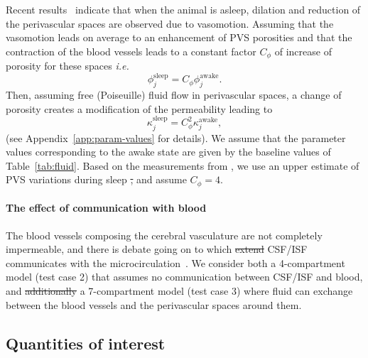 \documentclass[a4paper,11pt]{article} %
\newcommand{\ie}{\emph{i.e.}\;}
\newcommand{\eg}{\emph{e.g.}\;}
\newcommand{\1}{^{(1)}}
\newcommand{\2}{^{(2)}}
\newcommand{\Cinulin}{$\prescript{14}{}{\text{C}}$-inulin }
\newcommand{\commentout}[1]{}
\providecommand{\DIFaddtex}[1]{{\protect\color{blue}\uwave{#1}}} %
\providecommand{\DIFdeltex}[1]{{\protect\color{red}\sout{#1}}}                      %
\providecommand{\DIFaddbegin}{} %
\providecommand{\DIFaddend}{} %
\providecommand{\DIFdelbegin}{} %
\providecommand{\DIFdelend}{} %
\providecommand{\DIFadd}[1]{\texorpdfstring{\DIFaddtex{#1}}{#1}} %
\providecommand{\DIFdel}[1]{\texorpdfstring{\DIFdeltex{#1}}{}} %
\newcommand{\DIFscaledelfig}{0.5}
\newlength{\DIFdelgraphicswidth} %
\newlength{\DIFdelgraphicsheight} %
\newcommand{\DIFaddincludegraphics}[2][]{{\color{blue}\fbox{\DIFOincludegraphics[#1]{#2}}}} %
\newcommand{\DIFdelincludegraphics}[2][]{%
\sbox{\DIFdelgraphicsbox}{\DIFOincludegraphics[#1]{#2}}%
\settoboxwidth{\DIFdelgraphicswidth}{\DIFdelgraphicsbox} %
\settoboxtotalheight{\DIFdelgraphicsheight}{\DIFdelgraphicsbox} %
\scalebox{\DIFscaledelfig}{%
\parbox[b]{\DIFdelgraphicswidth}{\usebox{\DIFdelgraphicsbox}\\[-\baselineskip] \rule{\DIFdelgraphicswidth}{0em}}\llap{\resizebox{\DIFdelgraphicswidth}{\DIFdelgraphicsheight}{%
\setlength{\unitlength}{\DIFdelgraphicswidth}%
\begin{picture}(1,1)%
\thicklines\linethickness{2pt} %
{\color[rgb]{1,0,0}\put(0,0){\framebox(1,1){}}}%
{\color[rgb]{1,0,0}\put(0,0){\line( 1,1){1}}}%
{\color[rgb]{1,0,0}\put(0,1){\line(1,-1){1}}}%
\end{picture}%
}\hspace*{3pt}}} %
} %
\DeclareRobustCommand{\DIFaddbegin}{\DIFOaddbegin \let\includegraphics\DIFaddincludegraphics} %
\DeclareRobustCommand{\DIFaddend}{\DIFOaddend \let\includegraphics\DIFOincludegraphics} %
\DeclareRobustCommand{\DIFdelbegin}{\DIFOdelbegin \let\includegraphics\DIFdelincludegraphics} %
\DeclareRobustCommand{\DIFdelend}{\DIFOaddend \let\includegraphics\DIFOincludegraphics} %
\begin{document}
Recent results~\cite{Bojarskaite2022} indicate that when the animal is asleep, dilation and reduction of the perivascular spaces are observed due to vasomotion. Assuming that the vasomotion leads on average to an enhancement of PVS porosities and that the contraction of the blood vessels leads to a constant factor $C_\phi$ of increase of porosity for these spaces \ie 
\[
    \phi^\text{sleep}_j = C_\phi \phi_j^\text{awake}.
\]
Then, assuming free (Poiseuille) fluid flow in perivascular spaces, a change of porosity creates a modification of the permeability leading to 
\[
    \kappa_j^\text{sleep} = C_\phi^2 \kappa_j^\text{awake},
\]
(see Appendix~\ref{app:param-values} for details).
We assume that the parameter values corresponding to the awake state are given by the baseline values of Table~\ref{tab:fluid}. Based on the measurements from \cite{Bojarskaite2022}, we use an upper estimate of PVS variations during sleep \DIFdelbegin \DIFdel{, }\DIFdelend and assume $C_\phi=4$.


\paragraph{The effect of communication with blood}
The blood vessels composing the cerebral vasculature are not completely impermeable, and there is \DIFaddbegin \DIFadd{a }\DIFaddend debate going on to which \DIFdelbegin \DIFdel{extend }\DIFdelend \DIFaddbegin \DIFadd{extent }\DIFaddend CSF/ISF communicates with the microcirculation~\cite{Oreskovic-2010-formation}. We consider both a 4-compartment model (test case 2) that assumes no communication between CSF/ISF and blood, and \DIFdelbegin \DIFdel{additionally }\DIFdelend a 7-compartment model (test case 3) where fluid can exchange between the blood vessels and the perivascular spaces around them. 



\DIFdelbegin \DIFdel{\commentout{
\paragraph{The effect of blood vessels}
In the usual picture of the Glymphatic system, the leakage or resorption of fluid from the blood vessels is not considered. However, even though the BBB is known to be a tight selective barrier, a small amount of fluid can cross the membrane of blood vessels. The hydraulic conductivity of capillaries, arterioles and venules have been measured in different species and is known to not be zero (see \eg~\cite{fraser1990measurement, kimura1993measurement, roberts2009ppar}). We consider the effect of fluid leakage from the blood vessel in the third test case corresponding to an application of the model~\eqref{eq:main-system} with 7 compartments. The baseline parameter values for the fluid flow are given in Table~\ref{tab:fluid} and for the transfer between compartments in Table~\ref{tab:exchange}. We highlight here that no transfer of \Cinulin from PVS to the blood is considered since this molecule is known to not cross the BBB.
}
}\DIFdelend \subsection{Quantities of interest}
\end{document}
